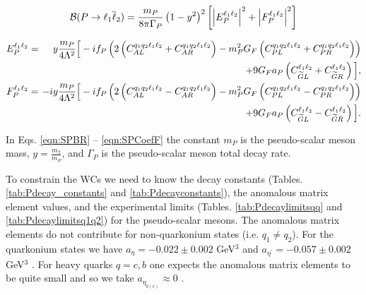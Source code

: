 \documentclass[12pt]{article}
\begin{document}
\begin{eqnarray}\label{eqn:SPBR}
{\cal B}(P \to \ell_1 \overline \ell_2) = \frac{m_P}{8\pi \Gamma_P} \left(1-y^2\right)^2
\left[\left|E_P^{\ell_1\ell_2}\right|^2 + \left|F_P^{\ell_1\ell_2}\right|^2\right]
\end{eqnarray}

\begin{eqnarray}
E_P^{\ell_1\ell_2} &=& \,\,\,y \frac{m_P}{4 \Lambda^2} \Big[
- i f_{P} \left( 2 \left(C_{AL}^{q_1 q_2 \ell_1\ell_2}+C_{AR}^{q_1 q_2 \ell_1\ell_2}\right) - m_{P}^{2} G_{F} \left( C_{PL}^{q_1 q_2 \ell_1\ell_2} + C_{PR}^{q_1 q_2 \ell_1\ell_2} \right) \right) \nonumber \\
&& \hspace{2.75in}  + 9 G_F a_{P} \left(C_{\widetilde G L}^{\ell_1\ell_2} + C_{\widetilde G R}^{\ell_1\ell_2} \right) \Big], \label{eqn:SPCoefE} \\
F_P^{\ell_1\ell_2} &=& \!\!\!\!  -iy \frac{m_P}{4 \Lambda^2} \Big[-if_{P}\left( 2 \left(C_{AL}^{q_1 q_2 \ell_1\ell_2}-C_{AR}^{q_1 q_2 \ell_1\ell_2}\right) - m_P^2 G_F \left(C_{PL}^{q_1 q_2 \ell_1\ell_2}-C_{PR}^{q_1 q_2 \ell_1\ell_2}\right) \right) \nonumber \\
&& \hspace{2.75in} + 9 G_F a_{P} \left(C_{\widetilde G L}^{\ell_1\ell_2} - C_{\widetilde G R}^{\ell_1\ell_2} \right) \Big].  \label{eqn:SPCoefF}
\end{eqnarray}

In Eqs. \ref{eqn:SPBR} -- \ref{eqn:SPCoefF} the constant $m_P$ is the pseudo-scalar meson mass, $y= \tfrac{m_2}{m_P}$, and $\Gamma_P$ is the pseudo-scalar meson total decay rate.

To constrain the WCs we need to know the decay constants (Tables. \ref{tab:Pdecay_constants} and \ref{tab:Pdecayconstants}), the anomalous matrix element values, and the experimental limits (Tables. \ref{tab:Pdecaylimitsqq} and \ref{tab:Pdecaylimitsq1q2}) for the pseudo-scalar mesons.  The anomalous matrix elements do not contribute for non-quarkonium states (i.e. $q_1 \neq q_2$).  For the quarkonium states we have $a_{\eta} = -0.022 \pm 0.002$ GeV$^3$ and $a_{\eta^\prime} = -0.057 \pm 0.002$ GeV$^3$ \cite{Beneke:2002jn}.  For heavy quarks $q=c,b$ one expects 
the anomalous matrix elements to be quite small and so we take $a_{\eta_{b(c)}} \approx 0$ \cite{Hazard:2016fnc}.
\end{document}
